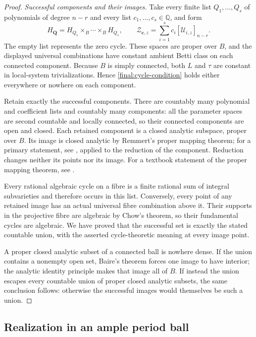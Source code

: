 \documentclass[11pt]{amsart}
\newcommand{\Q}{\mathbb Q}
\theoremstyle{definition}
\theoremstyle{remark}
\numberwithin{equation}{section}
\begin{document}
\begin{proof}
\emph{Successful components and their images.}
Take every finite list $Q_1,\ldots,Q_s$ of polynomials of degree $n-r$
and every list $c_1,\ldots,c_s\in\Q$, and form
\[
 H_{\boldsymbol Q}=H_{Q_1}\times_B\cdots\times_B H_{Q_s},
 \qquad \mathcal Z_{\boldsymbol c,z}
       =\sum_{i=1}^s c_i[\mathcal U_{i,z}]_{n-r}.
\]
The empty list represents the zero cycle.  These spaces are proper
over $B$, and the displayed universal combinations have constant
ambient Betti class on each connected component.  Because $B$ is
simply connected, both $L$ and $\tau$ are constant in local-system
trivializations.  Hence \eqref{final:cycle-condition} holds either
everywhere or nowhere on each component.

Retain exactly the successful components.  There are countably many
polynomial and coefficient lists and countably many components:
all the parameter spaces are second countable and locally connected,
so their connected components are open and closed.  Each retained
component is a closed analytic subspace, proper over $B$.  Its image
is closed analytic by Remmert's proper mapping theorem; for a primary
statement, see \cite[\S7.1, Satz~1]{GrauertProperImage}, applied to the
reduction of the component.  Reduction changes neither its points
nor its image.  For a textbook statement of the proper mapping theorem,
see \cite[Chapter~II, Section~8.2, Theorem~8.8]{Demailly2012}.

Every rational algebraic cycle on a fibre is a finite rational sum
of integral subvarieties and therefore occurs in this list.
Conversely, every point of any retained image has an actual universal
fibre combination above it.  Their supports in the projective fibre
are algebraic by Chow's theorem, so their fundamental cycles are
algebraic.  We have proved that the successful
set is exactly the stated countable union, with the asserted
cycle-theoretic meaning at every image point.

A proper closed analytic subset of a connected ball is nowhere dense.
If the union contains a nonempty open set, Baire's theorem forces
one image to have interior; the analytic identity principle makes
that image all of $B$.  If instead the union escapes every countable
union of proper closed analytic subsets, the same conclusion follows:
otherwise the successful images would themselves be such a union.
\end{proof}

\subsection{Realization in an ample period ball}
\end{document}
